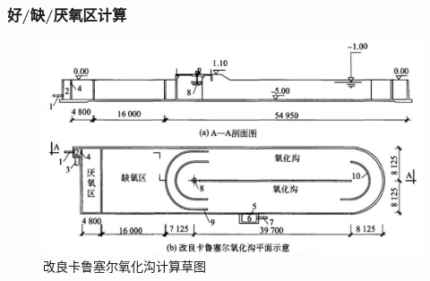 \subsubsection{好/缺/厌氧区计算}

\begin{figure}[H]
  \centering
  \includegraphics[width=\textwidth]{figures/Sketch of the modified Carrousel oxidation ditch.png}
  \caption{改良卡鲁塞尔氧化沟计算草图}
  \label{fig:carrousel-oxidation-ditch}
\end{figure}

